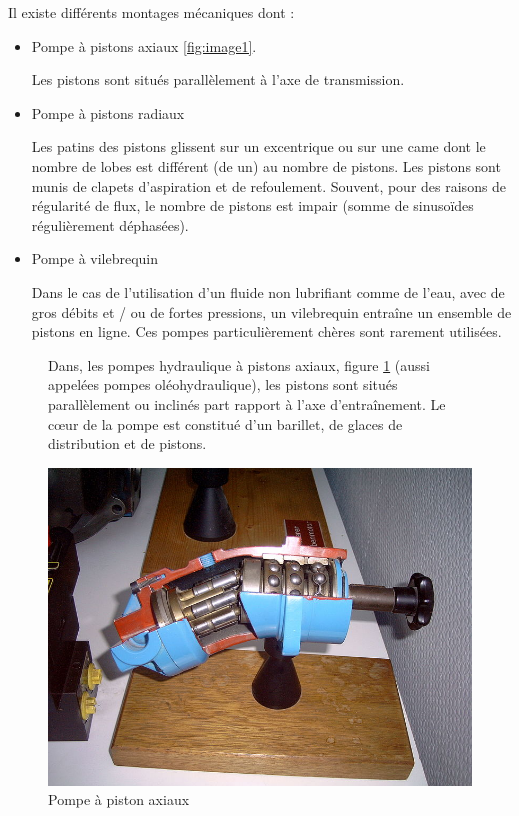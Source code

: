 Il existe différents montages mécaniques dont :
\begin{itemize}
 \item Pompe à pistons axiaux \ref{fig:image1}.

Les pistons sont situés parallèlement à l'axe de transmission. 

 \item Pompe à pistons radiaux

Les patins des pistons glissent sur un excentrique ou sur une came dont le nombre de lobes est différent (de un) au nombre de pistons. Les pistons sont munis de clapets d'aspiration et de refoulement. Souvent, pour des raisons de régularité de flux, le nombre de pistons est impair (somme de sinusoïdes régulièrement déphasées).

\item Pompe à vilebrequin

Dans le cas de l'utilisation d'un fluide non lubrifiant comme de l'eau, avec de gros débits et / ou de fortes pressions, un vilebrequin entraîne un ensemble de pistons en ligne. Ces pompes particulièrement chères sont rarement utilisées.
\end{itemize}

\begin{figure}[htbp]
\begin{minipage}[c]{.55\linewidth}
Dans, les pompes hydraulique à pistons axiaux, figure \ref{fig:image2} (aussi appelées pompes oléohydraulique), les pistons sont situés parallèlement ou inclinés part rapport à l'axe d'entraînement. Le c\oe ur de la pompe est constitué d'un barillet, de glaces de distribution et de pistons.
\end{minipage}
\hfill
\begin{minipage}[c]{.4\linewidth}
\begin{center}
\includegraphics[width=\linewidth]{img/pompe_axiaux.jpg}
\caption{Pompe à piston axiaux}
\label{fig:image2}
\end{center}
\end{minipage}
\end{figure}


